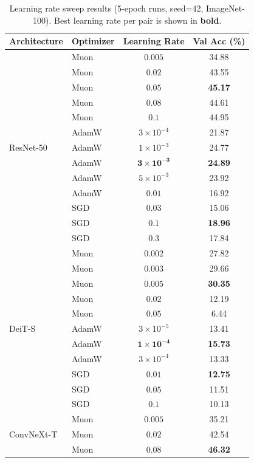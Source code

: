 \begin{table}[h]
\centering
\caption{Learning rate sweep results (5-epoch runs, seed=42, ImageNet-100). Best learning rate per pair is shown in \textbf{bold}.}
\label{tab:lr_sweep_in100}
\small
\begin{tabular}{llcc}
\toprule
Architecture & Optimizer & Learning Rate & Val Acc (\%) \\
\midrule
\multirow{13}{*}{ResNet-50}
 & Muon & $0.005$ & 34.88 \\
 & Muon & $0.02$ & 43.55 \\
 & Muon & $\mathbf{0.05}$ & \textbf{45.17} \\
 & Muon & $0.08$ & 44.61 \\
 & Muon & $0.1$ & 44.95 \\
\cmidrule(lr){2-4}
 & AdamW & $3 \times 10^{-4}$ & 21.87 \\
 & AdamW & $1 \times 10^{-3}$ & 24.77 \\
 & AdamW & $\mathbf{3 \times 10^{-3}}$ & \textbf{24.89} \\
 & AdamW & $5 \times 10^{-3}$ & 23.92 \\
 & AdamW & $0.01$ & 16.92 \\
\cmidrule(lr){2-4}
 & SGD & $0.03$ & 15.06 \\
 & SGD & $\mathbf{0.1}$ & \textbf{18.96} \\
 & SGD & $0.3$ & 17.84 \\
\midrule
\multirow{11}{*}{DeiT-S}
 & Muon & $0.002$ & 27.82 \\
 & Muon & $0.003$ & 29.66 \\
 & Muon & $\mathbf{0.005}$ & \textbf{30.35} \\
 & Muon & $0.02$ & 12.19 \\
 & Muon & $0.05$ & 6.44 \\
\cmidrule(lr){2-4}
 & AdamW & $3 \times 10^{-5}$ & 13.41 \\
 & AdamW & $\mathbf{1 \times 10^{-4}}$ & \textbf{15.73} \\
 & AdamW & $3 \times 10^{-4}$ & 13.33 \\
\cmidrule(lr){2-4}
 & SGD & $\mathbf{0.01}$ & \textbf{12.75} \\
 & SGD & $0.05$ & 11.51 \\
 & SGD & $0.1$ & 10.13 \\
\midrule
\multirow{10}{*}{ConvNeXt-T}
 & Muon & $0.005$ & 35.21 \\
 & Muon & $0.02$ & 42.54 \\
 & Muon & $\mathbf{0.08}$ & \textbf{46.32} \\

\end{tabular}
\end{table}
